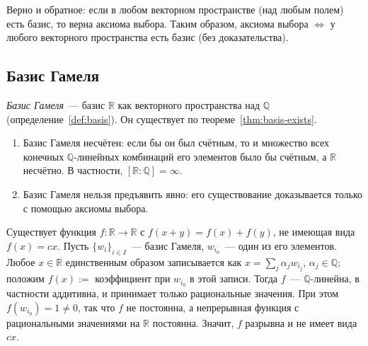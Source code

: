 \documentclass[12pt]{article}
\begin{document}
	\begin{note}
		Верно и обратное: если в любом векторном пространстве (над любым полем) есть базис, то верна аксиома выбора. Таким образом, аксиома выбора $\Leftrightarrow$ у любого векторного пространства есть базис (без доказательства).
	\end{note}

	\subsection{Базис Гамеля}

	\begin{definition}\label{def:hamel}
		\emph{Базис Гамеля}~--- базис $\mathbb{R}$ как векторного пространства над $\mathbb{Q}$ (определение~\ref{def:basis}). Он существует по теореме~\ref{thm:basis-exists}.
	\end{definition}

	\begin{property}
		\begin{enumerate}
			\item Базис Гамеля несчётен: если бы он был счётным, то и множество всех конечных $\mathbb{Q}$-линейных комбинаций его элементов было бы счётным, а $\mathbb{R}$ несчётно. В частности, $[\mathbb{R} : \mathbb{Q}] = \infty$.
			\item Базис Гамеля нельзя предъявить явно: его существование доказывается только с помощью аксиомы выбора.
		\end{enumerate}
	\end{property}

	\begin{example}
		Существует функция $f: \mathbb{R} \to \mathbb{R}$ с $f(x + y) = f(x) + f(y)$, не имеющая вида $f(x) = cx$. Пусть $\{ w_i \}_{i \in I}$~--- базис Гамеля, $w_{i_0}$~--- один из его элементов. Любое $x \in \mathbb{R}$ единственным образом записывается как $x = \sum_j \alpha_j w_{i_j}$, $\alpha_j \in \mathbb{Q}$; положим $f(x) :=$ коэффициент при $w_{i_0}$ в этой записи. Тогда $f$~--- $\mathbb{Q}$-линейна, в частности аддитивна, и принимает только рациональные значения. При этом $f(w_{i_0}) = 1 \ne 0$, так что $f$ не постоянна, а непрерывная функция с рациональными значениями на $\mathbb{R}$ постоянна. Значит, $f$ разрывна и не имеет вида $cx$.
	\end{example}
\end{document}
